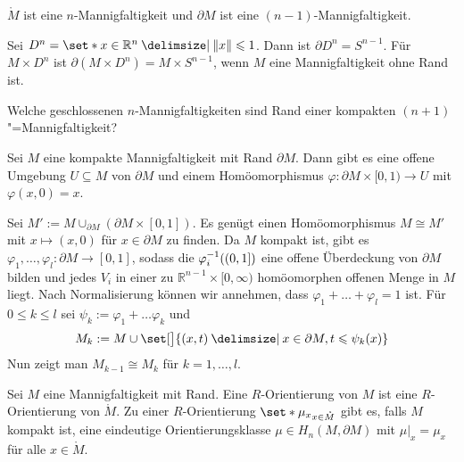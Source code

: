 \begin{bemerkung}[{name=[Der Rand ist eine $(n-1)$-Mannigfaltigkeit]}]
	$\mathring{M}$ ist eine $n$-Mannigfaltigkeit und $\partial M$ ist eine $(n-1)$-Mannigfaltigkeit.
\end{bemerkung}

\begin{beispiel}[{name=[Mannigfaltigkeit mit Rand]}]
	Sei $D^n = \set*{x \in \mathbb{R}^n \given \norm*{x}\le 1}$. Dann ist $\partial D^n = S^{n-1}$.
	Für $M \times D^n$ ist $\partial (M \times D^n) = M \times S^{n-1}$, wenn $M$ eine Mannigfaltigkeit ohne Rand ist.
\end{beispiel}

\begin{frage}
	Welche geschlossenen $n$-Mannigfaltigkeiten sind Rand einer kompakten $(n+1)$"=Mannigfaltigkeit?
\end{frage}

\begin{satz}[name={Kragensatz},label=kragensatz]
	Sei $M$ eine kompakte Mannigfaltigkeit mit Rand $\partial M$. 
	Dann gibt es eine offene Umgebung $U \subseteq M$ von $\partial M$ und einem Homöomorphismus $\varphi \colon \partial M \times [0,1) \to U$ mit ${\varphi(x,0)=x}$.
\end{satz}
\begin{beweis}[name={Skizze}]
	Sei $M' := M \cup_{\partial M} (\partial M \times [0,1])$.
	Es genügt einen Homöomorphismus $M \cong M'$ mit $x \mapsto (x,0)$ für $x \in \partial M$ zu finden. 
	Da $M$ kompakt ist, gibt es $\varphi_1, \ldots , \varphi_l \colon \partial M \to [0,1]$, sodass die $\varphi_i^{-1}\enbrace*{(0,1]}$ eine offene Überdeckung von $\partial M$ bilden und jedes $V_i$ in einer zu $\mathbb{R}^{n-1} \times [0,\infty)$ homöomorphen offenen Menge in $M$ liegt. 
	Nach Normalisierung können wir annehmen, dass $\varphi_1 + \ldots + \varphi_l =1$ ist.
	Für $0 \le k \le l$ sei $\psi_k := \varphi_1 + \ldots \varphi_k$ und 
	\[
		M_k := M \cup \set[\big]{(x,t) \given x \in \partial M, t \le \psi_k(x)}
	\]
	Nun zeigt man $M_{k-1} \cong M_k$ für $k=1,\ldots ,l$.
\end{beweis}

\begin{bemerkung}[{name=[Orientierung einer Mannigfaltigkeit mit Rand]}]
	Sei $M$ eine Mannigfaltigkeit mit Rand. 
	Eine $R$-Orientierung von $M$ ist eine $R$-Orientierung von $\mathring{M}$.
	Zu einer $R$-Orientierung $\set*{\mu_x}_{x \in \mathring{M}}$ gibt es, falls $M$ kompakt ist, eine eindeutige Orientierungsklasse $\mu \in H_n(M, \partial M)$ mit $\mu|_x = \mu_x$ für alle $x \in \mathring{M}$.
\end{bemerkung}

